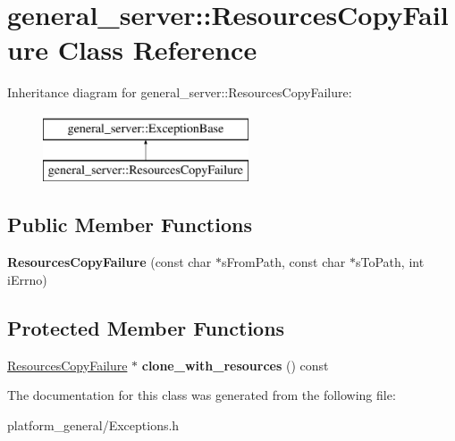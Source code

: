 \hypertarget{classgeneral__server_1_1ResourcesCopyFailure}{\section{general\-\_\-server\-:\-:\-Resources\-Copy\-Failure \-Class \-Reference}
\label{classgeneral__server_1_1ResourcesCopyFailure}
}
\-Inheritance diagram for general\-\_\-server\-:\-:\-Resources\-Copy\-Failure\-:\begin{figure}[H]
\begin{center}
\leavevmode
\includegraphics[height=2.000000cm]{classgeneral__server_1_1ResourcesCopyFailure}
\end{center}
\end{figure}
\subsection*{\-Public \-Member \-Functions}
\begin{DoxyCompactItemize}
\item 
\hypertarget{classgeneral__server_1_1ResourcesCopyFailure_a093e9ffa59c80e7b94a0a27e9c652c81}{{\bfseries \-Resources\-Copy\-Failure} (const char $\ast$s\-From\-Path, const char $\ast$s\-To\-Path, int i\-Errno)}\label{classgeneral__server_1_1ResourcesCopyFailure_a093e9ffa59c80e7b94a0a27e9c652c81}

\end{DoxyCompactItemize}
\subsection*{\-Protected \-Member \-Functions}
\begin{DoxyCompactItemize}
\item 
\hypertarget{classgeneral__server_1_1ResourcesCopyFailure_aa8de87caf5f447c726dccf4f36d2234d}{\hyperlink{classgeneral__server_1_1ResourcesCopyFailure}{\-Resources\-Copy\-Failure} $\ast$ {\bfseries clone\-\_\-with\-\_\-resources} () const }\label{classgeneral__server_1_1ResourcesCopyFailure_aa8de87caf5f447c726dccf4f36d2234d}

\end{DoxyCompactItemize}


\-The documentation for this class was generated from the following file\-:\begin{DoxyCompactItemize}
\item 
platform\-\_\-general/\-Exceptions.\-h\end{DoxyCompactItemize}
